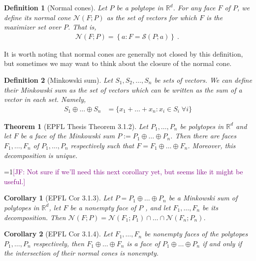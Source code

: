 \documentclass[12pt]{article}
\newcommand{\Comments}{1}
\newcommand{\mynote}[2]{\ifnum\Comments=1\textcolor{#1}{#2}\fi}
\newcommand{\jessie}[1]{\mynote{purple}{[JF: #1]}}
\newcommand{\reals}{\mathbb{R}}
\newcommand{\N}{\mathcal{N}}
\newtheorem{theorem}{Theorem}
\newtheorem{definition}{Definition}
\newtheorem{corollary}{Corollary}
\begin{document}
\begin{definition}[Normal cones]
  Let $P$ be a polytope in $\reals^d$.
  For any face $F$ of $P$, we define its \emph{normal cone} $\N(F;P)$ as the set of vectors for which $F$ is the maximizer set over $P$.
  That is,
  \begin{align*}
    \N(F;P) = \left\{a : F = \mathcal{S}(P; a) \right\}~.~
  \end{align*}
\end{definition}

  It is worth noting that normal cones are generally not closed by this definition, but sometimes we may want to think about the closure of the normal cone.

\begin{definition}[Minkowski sum]
	Let $S_1, S_2, \ldots, S_n$ be sets of vectors.
	We can define their \emph{Minkowski sum} as the set of vectors which can be written as the sum of a vector in each set.
	Namely,
	\begin{align*}
	S_1 \oplus \ldots \oplus S_n &= \{x_1 + \ldots + x_n : x_i \in S_i \; \forall i \}
	\end{align*}
\end{definition}

\begin{theorem}[EPFL Thesis Theorem 3.1.2]
	Let $P_1, \ldots, P_n$ be polytopes in $\reals^d$ and let $F$ be a face of the Minkowski sum $P := P_1 \oplus \ldots \oplus P_n$.
	Then there are faces $F_1, \ldots, F_n$ of $P_1, \ldots, P_n$ respectively such that $F = F_1 \oplus \ldots \oplus F_n$.
	Moreover, this decomposition is unique.
\end{theorem}

\jessie{Not sure if we'll need this next corollary yet, but seems like it might be useful.}
\begin{corollary}[EPFL Cor 3.1.3]\label{cor:face-decomp-normal-cones}
  Let $P = P_1 \oplus \ldots \oplus P_n$ be a Minkowski sum of polytopes in $\reals^d$, let $F$ be a nonempty face of $P$ , and let $F_1, \ldots, F_n$ be its decomposition.
  Then $\N(F;P) = \N(F_1;P_1) \cap \ldots \cap \N(F_n; P_n)$.
\end{corollary}

\begin{corollary}[EPFL Cor 3.1.4]
  Let $F_1, \ldots, F_n$ be nonempty faces of the polytopes $P_1, \ldots, P_n$ respectively, then $F_1 \oplus \ldots \oplus F_n$ is a face of $P_1 \oplus \ldots \oplus P_n$ if and only if the intersection of their normal cones is nonempty.
\end{corollary}
\end{document}

